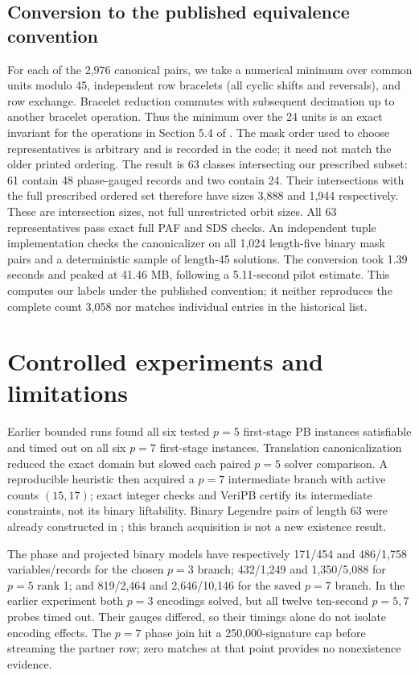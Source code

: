 \documentclass[11pt]{article}
\begin{document}
\subsection{Conversion to the published equivalence convention}
For each of the 2,976 canonical pairs, we take a numerical minimum over
common units modulo 45, independent row bracelets (all cyclic shifts and
reversals), and row exchange. Bracelet reduction commutes with subsequent
decimation up to another bracelet operation. Thus the minimum over the 24
units is an exact invariant for the operations in Section 5.4 of
\cite{fletcher}. The mask order used to choose representatives is arbitrary
and is recorded in the code; it need not match the older printed ordering.
The result is 63 classes intersecting our prescribed subset: 61 contain 48
phase-gauged records and two contain 24. Their intersections with the full
prescribed ordered set therefore have sizes 3,888 and 1,944 respectively.
These are intersection sizes, not full unrestricted orbit sizes.
All 63 representatives pass exact full PAF and SDS checks. An independent
tuple implementation checks the canonicalizer on all 1,024 length-five
binary mask pairs and a deterministic sample of length-45 solutions.
The conversion took 1.39 seconds and peaked at 41.46 MB, following a
5.11-second pilot estimate. This computes our labels under the published
convention; it neither reproduces the complete count 3,058 nor matches
individual entries in the historical list.

\section{Controlled experiments and limitations}
Earlier bounded runs found all six tested $p=5$ first-stage PB instances
satisfiable and timed out on all six $p=7$ first-stage instances. Translation
canonicalization reduced the exact domain but slowed each paired $p=5$
solver comparison. A reproducible heuristic then acquired a $p=7$
intermediate branch with active counts $(15,17)$; exact integer checks and
VeriPB certify its intermediate constraints, not its binary liftability.
Binary Legendre pairs of length 63 were already constructed in
\cite{issac}; this branch acquisition is not a new existence result.

The phase and projected binary models have respectively 171/454 and
486/1,758 variables/records for the chosen $p=3$ branch; 432/1,249 and
1,350/5,088 for $p=5$ rank 1; and 819/2,464 and 2,646/10,146 for the
saved $p=7$ branch. In the earlier experiment both $p=3$ encodings solved,
but all twelve ten-second $p=5,7$ probes timed out. Their gauges differed,
so their timings alone do not isolate encoding effects. The $p=7$ phase
join hit a 250,000-signature cap before streaming the partner row; zero
matches at that point provides no nonexistence evidence.
\end{document}
